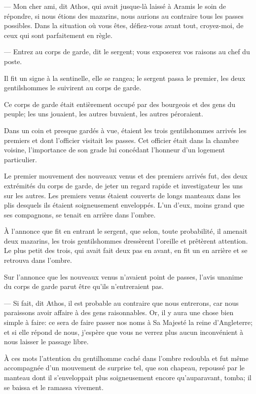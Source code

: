— Mon cher ami, dit Athos, qui avait jusque-là laissé à Aramis le soin de répondre, si nous étions des mazarins, nous aurions au contraire tous les passes possibles. Dans la situation où vous êtes, défiez-vous avant tout, croyez-moi, de ceux qui sont parfaitement en règle.

— Entrez au corps de garde, dit le sergent; vous exposerez vos raisons au chef du poste.

Il fit un signe à la sentinelle, elle se rangea; le sergent passa le premier, les deux gentilshommes le suivirent au corps de garde.

Ce corps de garde était entièrement occupé par des bourgeois et des gens du peuple; les uns jouaient, les autres buvaient, les autres péroraient.

Dans un coin et presque gardés à vue, étaient les trois gentilshommes arrivés les premiers et dont l'officier visitait les passes. Cet officier était dans la chambre voisine, l'importance de son grade lui concédant l'honneur d'un logement particulier.

Le premier mouvement des nouveaux venus et des premiers arrivés fut, des deux extrémités du corps de garde, de jeter un regard rapide et investigateur les uns sur les autres. Les premiers venus étaient couverts de longs manteaux dans les plis desquels ils étaient soigneusement enveloppés. L'un d'eux, moins grand que ses compagnons, se tenait en arrière dans l'ombre.

À l'annonce que fit en entrant le sergent, que selon, toute probabilité, il amenait deux mazarins, les trois gentilshommes dressèrent l'oreille et prêtèrent attention. Le plus petit des trois, qui avait fait deux pas en avant, en fit un en arrière et se retrouva dans l'ombre.

Sur l'annonce que les nouveaux venus n'avaient point de passes, l'avis unanime du corps de garde parut être qu'ils n'entreraient pas.

— Si fait, dit Athos, il est probable au contraire que nous entrerons, car nous paraissons avoir affaire à des gens raisonnables. Or, il y aura une chose bien simple à faire: ce sera de faire passer nos noms à Sa Majesté la reine d'Angleterre; et si elle répond de nous, j'espère que vous ne verrez plus aucun inconvénient à nous laisser le passage libre.

À ces mots l'attention du gentilhomme caché dans l'ombre redoubla et fut même accompagnée d'un mouvement de surprise tel, que son chapeau, repoussé par le manteau dont il s'enveloppait plus soigneusement encore qu'auparavant, tomba; il se baissa et le ramassa vivement.

